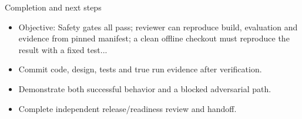 \documentclass[aspectratio=169,10pt]{beamer}
\begin{document}
\begin{frame}{Completion and next steps}
\small
\begin{itemize}
\item Objective: Safety gates all pass; reviewer can reproduce build, evaluation and evidence from pinned manifest; a clean offline checkout must reproduce the result with a fixed test...
\item Commit code, design, tests and true run evidence after verification.
\item Demonstrate both successful behavior and a blocked adversarial path.
\item Complete independent release/readiness review and handoff.
\end{itemize}

\end{frame}
\end{document}
